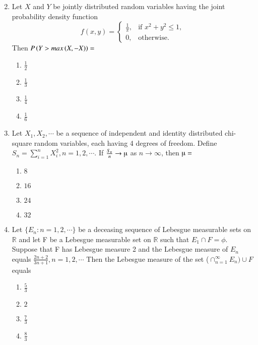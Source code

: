 \documentclass[journal,12pt,twocolumn]{IEEEtran}
\theoremstyle{remark}
\begin{document}
\begin{enumerate}
\begin{multicols}{2}
\begin{enumerate}
\end{enumerate}    
\end{multicols}
\item Let $X$ and $Y$ be jointly distributed random variables having the joint probability density function 
\[
f(x,y) = \begin{cases}
\frac{1}{\pi}, & \text{if } x^2 + y^2 \leq 1, \\
0, & \text{otherwise.}
\end{cases}
\]
Then $P\left(Y>max\left(X,-X\right)\right)=$
\begin{multicols}{2}
    \begin{enumerate}
    \item $\frac{1}{2}$
    \item $\frac{1}{3}$
    \item $\frac{1}{4}$
    \item $\frac{1}{6}$
\end{enumerate}
\end{multicols}
\item Let $X_1,X_2,\cdots$ be a sequence of independent and identity distributed chi-square random variables, each having 4 degrees of freedom. Define $S_n=\sum_{i=1}^{n}X_i^{2},n=1,2,\cdots$. If $\frac{S_n}{n}\rightarrow \micro$ as $n\rightarrow \infty$, then $\micro=$
\begin{multicols}{2}
    \begin{enumerate}
  \item $8$
  \item $16$
  \item $24$
  \item $32$
\end{enumerate}
\end{multicols}
\item Let $\{E_n:n=1,2,\cdots\}$ be a deceasing sequence of Lebesgue measurable sets on $\mathbb{R}$ and let F be a Lebesgue measurable set on $\mathbb{R}$ such that $E_1 \cap F=\phi$. Suppose that F has Lebesgue measure 2 and the Lebesgue measure of $E_n$ equals $\frac{2n+2}{3n+1},n=1,2,\cdots$ Then the Lebesgue measure of the set ($\cap_{n=1}^{\infty}E_n)\cup F$ equals
\begin{multicols}{2}
\begin{enumerate}
  \item $\frac{5}{3}$
    \item $2$
    \item $\frac{7}{3}$
    \item $\frac{8}{3}$
\end{enumerate}    

\end{multicols}
\end{enumerate}
\end{document}
